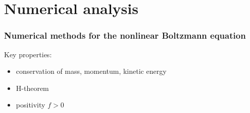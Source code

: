 \documentclass[mathserif]{beamer} %
\begin{document}
\section{Numerical analysis}

\begin{frame}
    \frametitle{Numerical methods for the nonlinear Boltzmann equation}
    Key properties:
    \begin{itemize}
        \item conservation of mass, momentum, kinetic energy
        \item H-theorem
        \item positivity \(f>0\)
    \end{itemize}
\end{frame}
\end{document}
